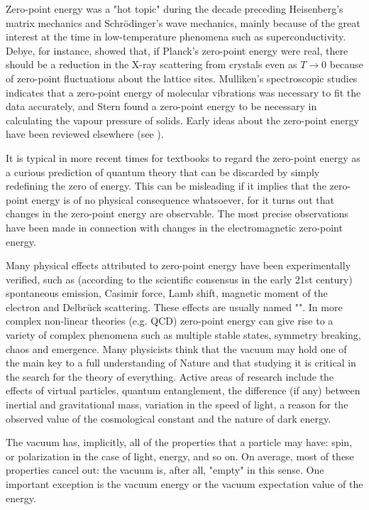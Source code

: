 	Zero-point energy was a "hot topic" during the decade preceding Heisenberg's matrix mechanics and Schrödinger's wave mechanics, mainly because of the great interest at the time in low-temperature phenomena such as superconductivity. Debye, for instance, showed that, if Planck's zero-point energy were real, there should be a reduction in the X-ray scattering from crystals even as $T \rightarrow 0$ because of zero-point fluctuations about the lattice sites. Mulliken's spectroscopic studies indicates that a zero-point energy of molecular vibrations was necessary to fit the data accurately, and Stern found a zero-point energy to be necessary in calculating the vapour pressure of solids. Early ideas about the zero-point energy have been reviewed elsewhere (see \cite{milonni1991zero}).

	It is typical in more recent times for textbooks to regard the zero-point energy as a curious prediction of quantum theory that can be discarded by simply redefining the zero of energy. This can be misleading if it implies that the zero-point energy is of no physical consequence whatsoever, for it turns out that changes in the zero-point energy are observable. The most precise observations have been made in connection with changes in the electromagnetic zero-point energy.

	Many physical effects attributed to zero-point energy have been experimentally verified, such as (according to the scientific consensus in the early 21st century) spontaneous emission, Casimir force, Lamb shift, magnetic moment of the electron and Delbrück scattering. These effects are usually named "". In more complex non-linear theories (e.g. QCD) zero-point energy can give rise to a variety of complex phenomena such as multiple stable states, symmetry breaking, chaos and emergence. Many physicists think that the vacuum may hold one of the main key to a full understanding of Nature and that studying it is critical in the search for the theory of everything. Active areas of research include the effects of virtual particles, quantum entanglement, the difference (if any) between inertial and gravitational mass, variation in the speed of light, a reason for the observed value of the cosmological constant and the nature of dark energy.
	
	 The vacuum has, implicitly, all of the properties that a particle may have: spin, or polarization in the case of light, energy, and so on. On average, most of these properties cancel out: the vacuum is, after all, "empty" in this sense. One important exception is the vacuum energy or the vacuum expectation value of the energy.
	 
